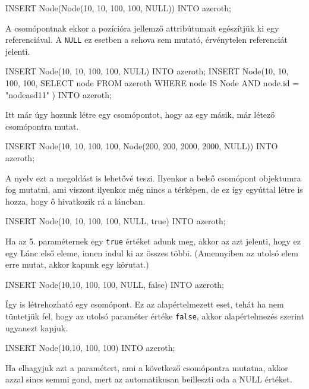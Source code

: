 \begin{sql}
INSERT Node(Node(10, 10, 100, 100, NULL)) INTO azeroth;
\end{sql}

A csomópontnak ekkor a pozícióra jellemző attribútumait egészítjük ki egy referenciával. A \texttt{NULL} ez esetben a sehova sem mutató, érvénytelen referenciát jelenti.

\begin{sql}
INSERT Node(10, 10, 100, 100, NULL) INTO azeroth;
INSERT Node(10, 10, 100, 100,
    SELECT node FROM azeroth
    WHERE node IS Node AND node.id = "nodeasd11"
) INTO azeroth;
\end{sql}

Itt már úgy hozunk létre egy csomópontot, hogy az egy másik, már létező csomópontra mutat.

\begin{sql}
INSERT Node(10, 10, 100, 100, Node(200, 200, 2000, 2000, NULL)) INTO azeroth;
\end{sql}

A nyelv ezt a megoldást is lehetővé teszi. Ilyenkor a belső csomópont objektumra fog mutatni, ami viszont ilyenkor még nincs a térképen, de ez így egyúttal létre is hozza, hogy ő hivatkozik rá a láncban.

\begin{sql}
INSERT Node(10, 10, 100, 100, NULL, true) INTO azeroth;
\end{sql}

Ha az 5. paraméternek egy \texttt{true} értéket adunk meg, akkor az azt jelenti, hogy ez egy Lánc első eleme, innen indul ki az összes többi. (Amennyiben az utolsó elem erre mutat, akkor kapunk egy körutat.)

\begin{sql}
INSERT Node(10,10, 100, 100, NULL, false) INTO azeroth;
\end{sql}

Így is létrehozható egy csomópont. Ez az alapértelmezett eset, tehát ha nem tüntetjük fel, hogy az utolsó paraméter értéke \texttt{false}, akkor alapértelmezés szerint ugyanezt kapjuk.

\begin{sql}
INSERT Node(10,10, 100, 100) INTO azeroth;
\end{sql}
Ha elhagyjuk azt a paramétert, ami a következő csomópontra mutatna, akkor azzal sincs semmi gond, mert az automatikusan beilleszti oda a NULL értéket.

